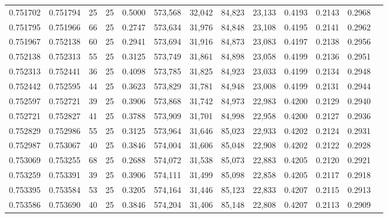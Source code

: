 \begin{tabular}{rrrrrrrrrrrrr}
0.751702 & 0.751794 &    25 &  25 &                                     0.5000 & 573,568 &  32,042 &  84,823 &  23,133 & 0.4193 & 0.2143 & 0.2968 \\
0.751795 & 0.751966 &    66 &  25 &                                     0.2747 & 573,634 &  31,976 &  84,848 &  23,108 & 0.4195 & 0.2141 & 0.2962 \\
0.751967 & 0.752138 &    60 &  25 &                                     0.2941 & 573,694 &  31,916 &  84,873 &  23,083 & 0.4197 & 0.2138 & 0.2956 \\
0.752138 & 0.752313 &    55 &  25 &                                     0.3125 & 573,749 &  31,861 &  84,898 &  23,058 & 0.4199 & 0.2136 & 0.2951 \\
0.752313 & 0.752441 &    36 &  25 &                                     0.4098 & 573,785 &  31,825 &  84,923 &  23,033 & 0.4199 & 0.2134 & 0.2948 \\
0.752442 & 0.752595 &    44 &  25 &                                     0.3623 & 573,829 &  31,781 &  84,948 &  23,008 & 0.4199 & 0.2131 & 0.2944 \\
0.752597 & 0.752721 &    39 &  25 &                                     0.3906 & 573,868 &  31,742 &  84,973 &  22,983 & 0.4200 & 0.2129 & 0.2940 \\
0.752721 & 0.752827 &    41 &  25 &                                     0.3788 & 573,909 &  31,701 &  84,998 &  22,958 & 0.4200 & 0.2127 & 0.2936 \\
0.752829 & 0.752986 &    55 &  25 &                                     0.3125 & 573,964 &  31,646 &  85,023 &  22,933 & 0.4202 & 0.2124 & 0.2931 \\
0.752987 & 0.753067 &    40 &  25 &                                     0.3846 & 574,004 &  31,606 &  85,048 &  22,908 & 0.4202 & 0.2122 & 0.2928 \\
0.753069 & 0.753255 &    68 &  25 &                                     0.2688 & 574,072 &  31,538 &  85,073 &  22,883 & 0.4205 & 0.2120 & 0.2921 \\
0.753259 & 0.753391 &    39 &  25 &                                     0.3906 & 574,111 &  31,499 &  85,098 &  22,858 & 0.4205 & 0.2117 & 0.2918 \\
0.753395 & 0.753584 &    53 &  25 &                                     0.3205 & 574,164 &  31,446 &  85,123 &  22,833 & 0.4207 & 0.2115 & 0.2913 \\
0.753586 & 0.753690 &    40 &  25 &                                     0.3846 & 574,204 &  31,406 &  85,148 &  22,808 & 0.4207 & 0.2113 & 0.2909 \\

\end{tabular}
